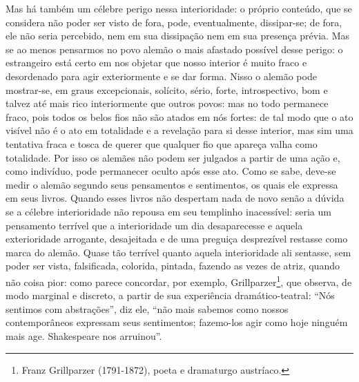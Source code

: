     Mas há também um célebre perigo nessa interioridade: o próprio
    conteúdo, que se considera não poder ser visto de fora, pode,
    eventualmente, dissipar-se; de fora, ele não seria percebido, nem em
    sua dissipação nem em sua presença prévia. Mas se ao menos pensarmos no
    povo alemão o mais afastado possível desse perigo: o estrangeiro
    está certo em nos objetar que nosso interior é muito fraco e
    desordenado para agir exteriormente e se dar forma. Nisso o alemão
    pode mostrar-se, em graus excepcionais, solícito, sério, forte,
    introspectivo, bom e talvez até mais rico interiormente que outros
    povos: mas no todo permanece fraco, pois todos os belos fios não são
    atados em nós fortes: de tal modo que o ato visível não é o ato em
    totalidade e a revelação para si desse interior, mas sim uma
    tentativa fraca e tosca de querer que qualquer fio que apareça valha
    como totalidade. Por isso os alemães não podem ser julgados a partir
    de uma ação e, como indivíduo, pode permanecer oculto após esse ato.
    Como se sabe, deve-se medir o alemão segundo seus pensamentos e
    sentimentos, os quais ele expressa em seus livros. Quando esses
    livros não despertam nada de novo senão a dúvida se a célebre
    interioridade não repousa em seu templinho inacessível: seria um
    pensamento terrível que a interioridade um dia desaparecesse e
    aquela exterioridade arrogante, desajeitada e de uma preguiça
    desprezível restasse como marca do alemão. Quase tão terrível quanto
    aquela interioridade ali sentasse, sem poder ser vista, falsificada,
    colorida, pintada, fazendo as vezes de atriz, quando não coisa pior:
    como parece concordar, por exemplo, Grillparzer\footnote{Franz
      Grillparzer (1791-1872), poeta e dramaturgo austríaco.}, que
    observa, de modo marginal e discreto, a partir de sua experiência
    dramático-teatral: ``Nós sentimos com abstrações'', diz ele, 
    ``não mais sabemos como nossos contemporâneos expressam seus sentimentos; 
    fazemo-los agir como  hoje ninguém mais age. Shakespeare nos arruinou''.

